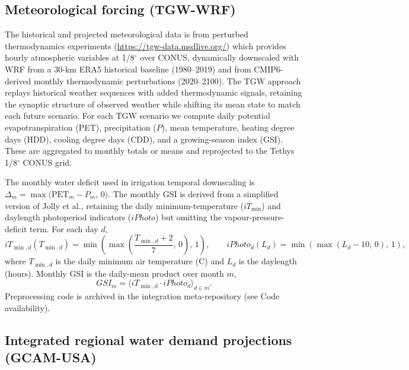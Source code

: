 \documentclass[fleqn,10pt]{wlscirep}
\begin{document}
\subsection*{Meteorological forcing (TGW-WRF)}

The historical and projected meteorological data is from perturbed thermodynamics experiments \cite{Jones2023TGW} (\href{https://tgw-data.msdlive.org/}{https://tgw-data.msdlive.org/}) which provides hourly atmospheric variables at 1/8$^{\circ}$ over CONUS, dynamically downscaled with WRF from a 30-km ERA5 historical baseline (1980--2019) and from CMIP6-derived monthly thermodynamic perturbations (2020--2100). The TGW approach replays historical weather sequences with added thermodynamic signals, retaining the synoptic structure of observed weather while shifting its mean state to match each future scenario. For each TGW scenario we compute daily potential evapotranspiration (PET), precipitation ($P$), mean temperature, heating degree days (HDD), cooling degree days (CDD), and a growing-season index (GSI). These are aggregated to monthly totals or means and reprojected to the Tethys 1/8$^{\circ}$ CONUS grid.

The monthly water deficit used in irrigation temporal downscaling is $\Delta_m = \max\!\big(\text{PET}_m - P_m,\, 0\big)$. The monthly GSI is derived from a simplified version of Jolly et al.\cite{Jolly_2005}, retaining the daily minimum-temperature ($iT_{\min}$) and daylength photoperiod indicators ($iPhoto$) but omitting the vapour-pressure-deficit term. For each day $d$,
\begin{equation}
iT_{\min,d}(T_{\min,d}) = \min\!\left(\max\!\left(\frac{T_{\min,d}+2}{7},\,0\right),\,1\right), \qquad
iPhoto_d(L_d) = \min\!\left(\max\!\left(L_d - 10,\,0\right),\,1\right),
\label{eq:gsi-components}
\end{equation}
where $T_{\min,d}$ is the daily minimum air temperature (\textdegree C) and $L_d$ is the daylength (hours). Monthly GSI is the daily-mean product over month $m$,
\begin{equation}
GSI_m = \big\langle iT_{\min,d} \cdot iPhoto_d \big\rangle_{d \in m}.
\label{eq:gsi-monthly}
\end{equation}
Preprocessing code is archived in the integration meta-repository (see Code availability).

\subsection*{Integrated regional water demand projections (GCAM-USA)}
\end{document}
